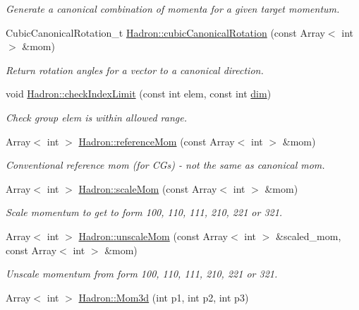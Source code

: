 \begin{DoxyCompactItemize}
\begin{DoxyCompactList}\small\item\em Generate a canonical combination of momenta for a given target momentum. \end{DoxyCompactList}\item 
Cubic\+Canonical\+Rotation\+\_\+t \mbox{\hyperlink{namespaceHadron_ada689173e1553ad2f452af24028eae2f}{Hadron\+::cubic\+Canonical\+Rotation}} (const Array$<$ int $>$ \&mom)
\begin{DoxyCompactList}\small\item\em Return rotation angles for a vector to a canonical direction. \end{DoxyCompactList}\item 
void \mbox{\hyperlink{namespaceHadron_a32841ac341a167a00453d3846a386fd9}{Hadron\+::check\+Index\+Limit}} (const int elem, const int \mbox{\hyperlink{adat__devel_2lib_2hadron_2irrep__util_8cc_a70b5e28b5bc3d1b63a7435c5fe50b837}{dim}})
\begin{DoxyCompactList}\small\item\em Check group elem is within allowed range. \end{DoxyCompactList}\item 
Array$<$ int $>$ \mbox{\hyperlink{namespaceHadron_a8a4e39ac150585731d18fb970ec8a1bd}{Hadron\+::reference\+Mom}} (const Array$<$ int $>$ \&mom)
\begin{DoxyCompactList}\small\item\em Conventional reference mom (for C\+Gs) -\/ not the same as canonical mom. \end{DoxyCompactList}\item 
Array$<$ int $>$ \mbox{\hyperlink{namespaceHadron_ab3424b316e2a4d8e820c88f8027742e1}{Hadron\+::scale\+Mom}} (const Array$<$ int $>$ \&mom)
\begin{DoxyCompactList}\small\item\em Scale momentum to get to form 100, 110, 111, 210, 221 or 321. \end{DoxyCompactList}\item 
Array$<$ int $>$ \mbox{\hyperlink{namespaceHadron_ad5e2b22f66d2effe70db7f0ba129eae1}{Hadron\+::unscale\+Mom}} (const Array$<$ int $>$ \&scaled\+\_\+mom, const Array$<$ int $>$ \&mom)
\begin{DoxyCompactList}\small\item\em Unscale momentum from form 100, 110, 111, 210, 221 or 321. \end{DoxyCompactList}\item 
Array$<$ int $>$ \mbox{\hyperlink{namespaceHadron_af72905f43cac8c79d2479565a6fe54d3}{Hadron\+::\+Mom3d}} (int p1, int p2, int p3)

\end{DoxyCompactItemize}

